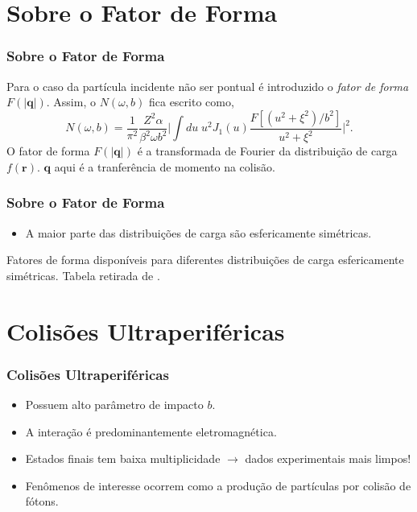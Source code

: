 \documentclass[xcolor=dvipsnames]{beamer}
\renewcommand{\vec}{\mathbf}
\begin{document}
\section{Sobre o Fator de Forma}
\begin{frame}
	\frametitle{Sobre o Fator de Forma}
	Para o caso da partícula incidente não ser pontual é introduzido o
	\textit{fator de forma} $F(|\vec{q}|)$. Assim, o $N(\omega , b)$ fica
	escrito como,
	\begin{equation}
		N(\omega , b) = \frac{1}{\pi ^2} \frac{Z^2 \alpha}{\beta ^2 \omega b^2}
		\Bigg| \int du \; u^2 J_1 (u) \frac{F[(u^2 + \xi ^2)/b^2]}{u^2 + \xi ^2}
		\Bigg|^2. \label{eq_EP-SPEC-F}
	\end{equation}
	O fator de forma $F(|\vec{q}|)$ é a transformada de Fourier da distribuição
	de carga $f(\vec{r})$. $\vec{q}$ aqui é a tranferência de momento na
	colisão.
\end{frame}

\begin{frame}
	\frametitle{Sobre o Fator de Forma}
	\begin{itemize}
		\item A maior parte das distribuições de carga são esfericamente
			simétricas.
	\end{itemize}
	{\footnotesize \renewcommand{\arraystretch}{3}
	\begin{table}
		
		\caption{Fatores de forma disponíveis para diferentes distribuições de
		carga esfericamente simétricas. Tabela retirada de \cite{povh6ed}.}
	\end{table}
	}
\end{frame}


\section{Colisões Ultraperiféricas}
\begin{frame}
	\frametitle{Colisões Ultraperiféricas}
	\begin{itemize}
		\item Possuem alto parâmetro de impacto $b$.
		\item A interação é predominantemente eletromagnética.
		\item Estados finais tem baixa multiplicidade $\rightarrow$ dados
			experimentais mais limpos!
		\item Fenômenos de interesse ocorrem como a produção de partículas por
			colisão de fótons.
	\end{itemize}
\end{frame}
\end{document}
